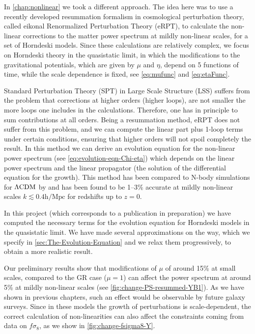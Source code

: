 In \cref{chap:nonlinear} we took a different approach. The idea here was to use a recently developed resummation
formalism in cosmological perturbation theory, called eikonal Renormalized Perturbation Theory (eRPT), to calculate 
the non-linear corrections to the matter power spectrum at mildly non-linear scales, for a set of Horndeski models.
Since these calculations are relatively complex, we focus on Horndeski theory in the quasistatic limit,
in which the modifications to the gravitational potentials, which are given by $\mu$ and $\eta$, depend on 5 functions
of time, while the scale dependence is fixed, see \cref{eq:mufunc} and \cref{eq:etaFunc}.

Standard Perturbation Theory (SPT) in Large Scale Structure (LSS) suffers from the problem that corrections at higher orders (higher loops),
are not smaller the more loops one includes in the calculations. Therefore, one has in principle to sum contributions at all orders.
Being a resummation method, eRPT does not suffer from this problem, and we can compute the linear part plus 1-loop terms under certain conditions, ensuring that
higher orders will not spoil completely the result.
In this method we can derive an evolution equation for the non-linear power spectrum (see \cref{eq:evolution-eqn-Chi-eta}) which
depends on the linear power spectrum and the linear propagator (the solution of the differential equation for the growth).
This method has been compared to N-body simulations for $\Lambda\mathrm{CDM}$ by  and has been found to be 1--3\% accurate at mildly non-linear 
scales $k \lesssim 0.4 \mathrm{h/Mpc}$ for redshifts up to $z=0$.

In this project (which corresponds to a publication in preparation) we have computed the necessary terms for the evolution equation
for Horndeski models in the quasistatic limit. 
We have made several approximations on the way, which we specify in \cref{sec:The-Evolution-Equation} and we relax them progressively, to 
obtain a more realistic result.

Our preliminary results show that modifications of $\mu$ of around 15\% at small scales, compared to the GR case ($\mu=1$)
can affect the power spectrum at around 5\% at mildly non-linear scales (see \cref{fig:change-PS-resummed-YB1}).
As we have shown in previous chapters, such an effect would be observable by future galaxy surveys.
Since in these models the growth of perturbations is scale-dependent,
the correct calculation of non-linearities can also affect the constraints coming from data on $f\sigma_8$,
as we show in \cref{fig:change-fsigma8-Y}.

